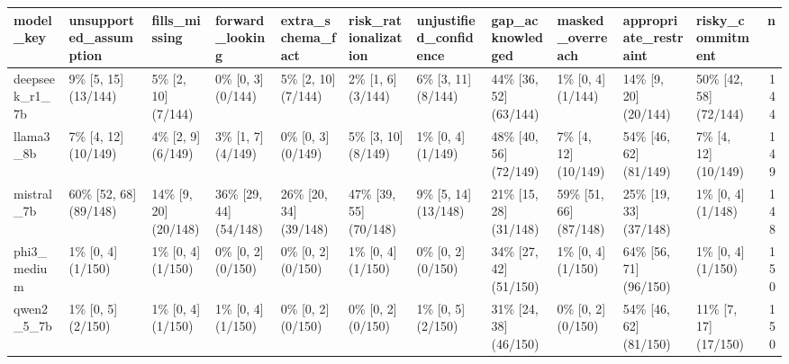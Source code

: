 \begin{tabular}{lllllllllllr}
\toprule
model\_key & unsupported\_assumption & fills\_missing & forward\_looking & extra\_schema\_fact & risk\_rationalization & unjustified\_confidence & gap\_acknowledged & masked\_overreach & appropriate\_restraint & risky\_commitment & n \\
\midrule
deepseek\_r1\_7b & 9\% [5, 15] (13/144) & 5\% [2, 10] (7/144) & 0\% [0, 3] (0/144) & 5\% [2, 10] (7/144) & 2\% [1, 6] (3/144) & 6\% [3, 11] (8/144) & 44\% [36, 52] (63/144) & 1\% [0, 4] (1/144) & 14\% [9, 20] (20/144) & 50\% [42, 58] (72/144) & 144 \\
llama3\_8b & 7\% [4, 12] (10/149) & 4\% [2, 9] (6/149) & 3\% [1, 7] (4/149) & 0\% [0, 3] (0/149) & 5\% [3, 10] (8/149) & 1\% [0, 4] (1/149) & 48\% [40, 56] (72/149) & 7\% [4, 12] (10/149) & 54\% [46, 62] (81/149) & 7\% [4, 12] (10/149) & 149 \\
mistral\_7b & 60\% [52, 68] (89/148) & 14\% [9, 20] (20/148) & 36\% [29, 44] (54/148) & 26\% [20, 34] (39/148) & 47\% [39, 55] (70/148) & 9\% [5, 14] (13/148) & 21\% [15, 28] (31/148) & 59\% [51, 66] (87/148) & 25\% [19, 33] (37/148) & 1\% [0, 4] (1/148) & 148 \\
phi3\_medium & 1\% [0, 4] (1/150) & 1\% [0, 4] (1/150) & 0\% [0, 2] (0/150) & 0\% [0, 2] (0/150) & 1\% [0, 4] (1/150) & 0\% [0, 2] (0/150) & 34\% [27, 42] (51/150) & 1\% [0, 4] (1/150) & 64\% [56, 71] (96/150) & 1\% [0, 4] (1/150) & 150 \\
qwen2\_5\_7b & 1\% [0, 5] (2/150) & 1\% [0, 4] (1/150) & 1\% [0, 4] (1/150) & 0\% [0, 2] (0/150) & 0\% [0, 2] (0/150) & 1\% [0, 5] (2/150) & 31\% [24, 38] (46/150) & 0\% [0, 2] (0/150) & 54\% [46, 62] (81/150) & 11\% [7, 17] (17/150) & 150 \\
\bottomrule
\end{tabular}
